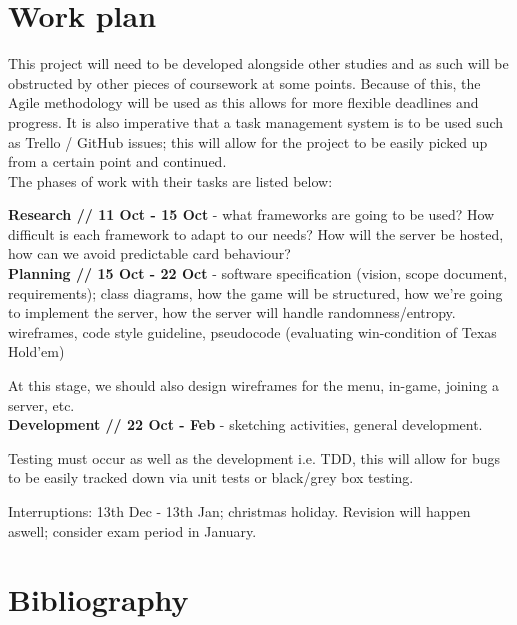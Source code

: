 \documentclass[11pt]{article}
\begin{document}
\newpage
\section*{Work plan}

This project will need to be developed alongside other studies and as such will be obstructed by other pieces of coursework at some points. Because of this, the Agile methodology will be used as this allows for more flexible deadlines and progress. It is also imperative that a task management system is to be used such as Trello / GitHub issues; this will allow for the project to be easily picked up from a certain point and continued.\\

The phases of work with their tasks are listed below:

\textbf{Research // 11 Oct - 15 Oct} - what frameworks are going to be used? How difficult is each framework to adapt to our needs? How will the server be hosted, how can we avoid predictable card behaviour?\\


\textbf{Planning // 15 Oct - 22 Oct} - software specification (vision, scope document, requirements); class diagrams, how the game will be structured, how we're going to implement the server, how the server will handle randomness/entropy. wireframes, code style guideline, pseudocode (evaluating win-condition of Texas Hold'em)

At this stage, we should also design wireframes for the menu, in-game, joining a server, etc. \\


\textbf{Development // 22 Oct - Feb } - sketching activities, general development.

Testing must occur as well as the development i.e. TDD, this will allow for bugs to be easily tracked down via unit tests or black/grey box testing. 



Interruptions: 13th Dec - 13th Jan; christmas holiday. Revision will happen aswell; consider exam period in January. 


\newpage
\section*{Bibliography}
\end{document}
